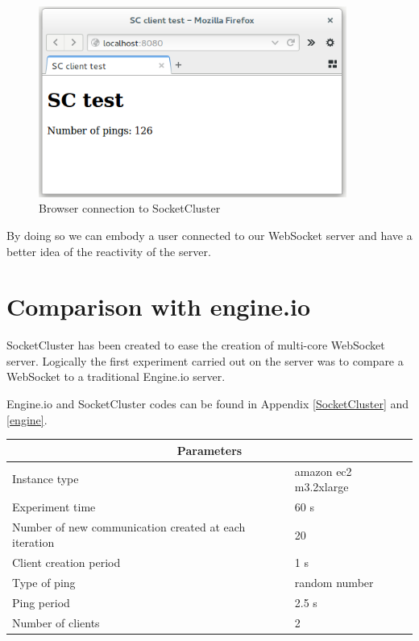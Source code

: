 \begin{figure}[H]
	\centering
		\includegraphics[width=0.9\textwidth]{./Figures/browser.png}
	\caption[Browser connection to SocketCluster]{Browser connection to SocketCluster}
	\label{fig:browser}
\end{figure}

By doing so we can embody a user connected to our WebSocket server and have a
better idea of the reactivity of the server.


\section{Comparison with engine.io}

SocketCluster has been created to ease the creation of multi-core WebSocket
server. Logically the first experiment carried out on the server was to compare
a WebSocket to a traditional Engine.io server. 

Engine.io and SocketCluster codes can be found in Appendix \ref{SocketCluster} and \ref{engine}. 

\begin{center}
  \begin{tabular}{ | l | l |}
  \hline
  \multicolumn{2}{|c|}{Parameters} \\
  \hline
    Instance type &  amazon ec2 m3.2xlarge\\ 
    Experiment time & 60 s \\
    Number of new communication created at each iteration & 20 \\
    Client creation period & 1 s \\
    Type of ping & random number \\ 
    Ping period & 2.5 s \\ 
    Number of clients & 2 \\
  \hline
  \end{tabular}
\end{center}

